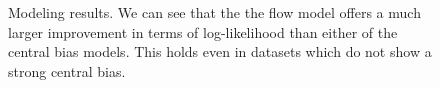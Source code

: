 \documentclass[a4paper, twocolumn, oneside, 11pt]{article}
\begin{document}
\begin{figure}
\centering
{}
\caption{Modeling results. We can see that the the flow model offers a much larger improvement in terms of log-likelihood than either of the central bias models. This holds even in datasets which do not show a strong central bias.}
\label{fig:nFlowDevAll}
\end{figure}
\end{document}
